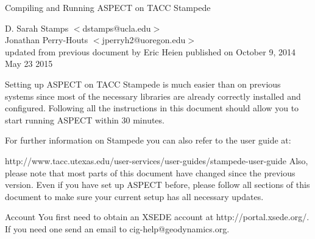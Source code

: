 \documentclass[11pt]{article}
\makeatletter
\renewcommand{\section}{\@startsection
  {section}{1}{0mm}{3mm}{0.5mm}{\bfseries\large}}
\makeatother
\begin{document}
\begin{centering}
{\Large Compiling and Running ASPECT on TACC Stampede}
\par
\vskip 3mm
D. Sarah Stamps $<$dstamps@ucla.edu$>$ \\
Jonathan Perry-Houts $<$jperryh2@uoregon.edu$>$ \\
updated from previous document by Eric Heien published on October 9, 2014 \\

May 23 2015


\vskip 0.1mm
\end{centering}
\vskip 2mm

Setting up ASPECT on TACC Stampede is much easier than on previous systems since
most of the necessary libraries are already correctly installed and configured. Following all
the instructions in this document should allow you to start running ASPECT within 30
minutes.

For further information on Stampede you can
also refer to the user guide at: 

http://www.tacc.utexas.edu/user-services/user-guides/stampede-user-guide
Also, please note that most parts of this document have changed since the previous
version. Even if you have set up ASPECT before, please follow all sections of this document
to make sure your current setup has all necessary updates.


\section{Account}
You first need to obtain an XSEDE account at http://portal.xsede.org/. If you need one send an email to cig-help@geodynamics.org.  
\end{document}
